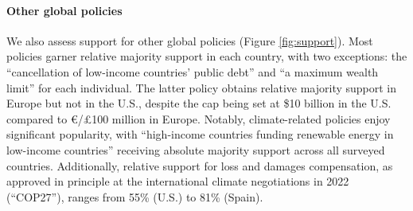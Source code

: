 \documentclass{nature}
\makeatletter
\renewenvironment*{figure}{\@float{figure}}{\end@float}
\makeatother
\begin{document}


\paragraph{Other global policies}\label{subsubsec:support_other_global_policies} %

We also assess support for other global policies (Figure \ref{fig:support}). Most policies garner relative majority support in each country, with two exceptions: the ``cancellation of low-income countries' public debt'' and ``a maximum wealth limit'' for each individual. The latter policy obtains relative majority support in Europe but not in the U.S., despite the cap being set at \$10 billion in the U.S. compared to \euro{}/£100 million in Europe. Notably, climate-related policies enjoy significant popularity, with ``high-income countries funding renewable energy in low-income countries'' receiving absolute majority support across all surveyed countries. Additionally, relative support for loss and damages compensation, as approved in principle at the international climate negotiations in 2022 (``COP27''), ranges from 55\% (U.S.) to 81\% (Spain).
\end{document}
